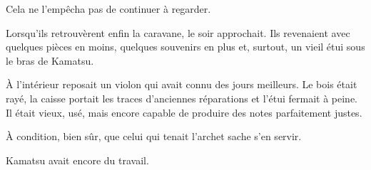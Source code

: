 Cela ne l'empêcha pas de continuer à regarder.

Lorsqu'ils retrouvèrent enfin la caravane, le soir approchait. Ils revenaient
avec quelques pièces en moins, quelques souvenirs en plus et, surtout, un
vieil étui sous le bras de Kamatsu.

À l'intérieur reposait un violon qui avait connu des jours meilleurs. Le bois
était rayé, la caisse portait les traces d'anciennes réparations et l'étui
fermait à peine. Il était vieux, usé, mais encore capable de produire des
notes parfaitement justes.

À condition, bien sûr, que celui qui tenait l'archet sache s'en servir.

Kamatsu avait encore du travail.